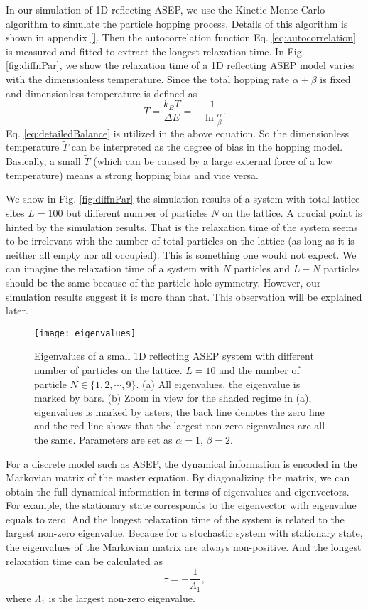 In our simulation of 1D reflecting ASEP, we use the Kinetic Monte Carlo algorithm to simulate the particle hopping process. Details of this algorithm is shown in appendix \ref{}. Then the autocorrelation function Eq. \eqref{eq:autocorrelation} is measured and fitted to extract the longest relaxation time. 
In Fig. \ref{fig:diffnPar}, we show the relaxation time of a 1D reflecting ASEP model varies with the dimensionless temperature. Since the total hopping rate $\alpha + \beta$ is fixed and dimensionless temperature is defined as 
\begin{equation}
    \label{eq:biasT}
    \tilde{T} = \frac{k_B T} {\Delta E} = - \frac{1}{\ln \frac{\alpha}{\beta}}.
\end{equation}
Eq. \eqref{eq:detailedBalance} is utilized in the above equation. So the dimensionless temperature $\tilde{T}$ can be interpreted as the degree of bias in the hopping model. Basically, a small $\tilde{T}$ (which can be caused by a large external force of a low temperature) means a strong hopping bias and vice versa.

We show in Fig. \ref{fig:diffnPar} the simulation results of a system with total lattice sites $L=100$ but different number of particles $N$ on the lattice. A crucial point is hinted by the simulation results. That is the relaxation time of the system seems to be irrelevant with the number of total particles on the lattice (as long as it is neither all empty nor all occupied). This is something one would not expect. We can imagine the relaxation time of a system with $N$ particles and $L-N$ particles should be the same because of the particle-hole symmetry. However, our simulation results suggest it is more than that. This observation will be explained later.

\begin{figure}[htpb]
    \centering
    \texttt{[image: eigenvalues]}
    \caption{Eigenvalues of a small 1D reflecting ASEP system with different number of particles on the lattice. $L=10$ and the number of particle $N\in\{1,2,\cdots,9\}$. (a) All eigenvalues, the eigenvalue is marked by bars. (b) Zoom in view for the shaded regime in (a), eigenvalues is marked by asters, the back line denotes the zero line and the red line shows that the largest non-zero eigenvalues are all the same. Parameters are set as $\alpha=1$, $\beta=2$.}
    \label{fig:eigenvalues}
\end{figure}
For a discrete model such as ASEP, the dynamical information is encoded in the Markovian matrix of the master equation. By diagonalizing the matrix, we can obtain the full dynamical information in terms of eigenvalues and eigenvectors. For example, the stationary state corresponds to the eigenvector with eigenvalue equals to zero. And the longest relaxation time of the system is related to the largest non-zero eigenvalue. Because for a stochastic system with stationary state, the eigenvalues of the Markovian matrix are always non-positive. And the longest relaxation time can be calculated as 
\begin{equation}
    \label{eq:eigenvalue2relaxation}
    \tau = - \frac{1}{\Lambda_1},
\end{equation}
where $\Lambda_1$ is the largest non-zero eigenvalue.

